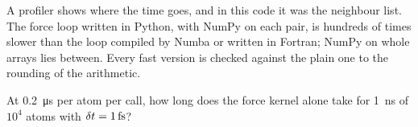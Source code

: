 \begin{keyidea}
A profiler shows where the time goes, and in this code it was the
neighbour list. The force loop written in Python, with NumPy on each pair,
is hundreds of times slower than the loop compiled by Numba or written in
Fortran; NumPy on whole arrays lies between. Every fast version is checked
against the plain one to the rounding of the arithmetic.
\end{keyidea}


\begin{selfcheck}
At \SI{0.2}{\micro\second} per atom per call, how long does the force
kernel alone take for \SI{1}{\nano\second} of $10^4$ atoms with $\dt =
\SI{1}{\femto\second}$?
\end{selfcheck}
